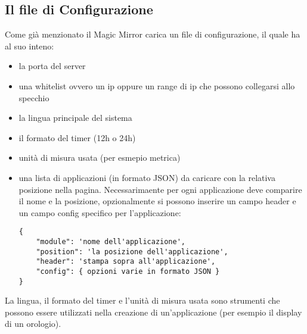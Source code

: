 \subsection{Il file di Configurazione}
Come già menzionato il Magic Mirror carica un file di configurazione, il quale ha al suo inteno:
\begin{itemize}
\item la porta del server
\item una whitelist ovvero un ip oppure un range di ip che possono collegarsi allo specchio
\item la lingua principale del sistema
\item il formato del timer (12h o 24h)
\item unità di misura usata (per esmepio metrica)
\item una lista di applicazioni (in formato JSON) da caricare con la relativa posizione nella pagina. Necessarimaente per ogni applicazione deve comparire il
nome e la posizione, opzionalmente si possono inserire un campo header e un campo config specifico per l'applicazione:
\begin{lstlisting}
{
	"module": 'nome dell'applicazione',
	"position": 'la posizione dell'applicazione',
	"header": 'stampa sopra all'applicazione',
	"config": { opzioni varie in formato JSON }
}
\end{lstlisting}
\end{itemize}
La lingua, il formato del timer e l'unità di misura usata sono strumenti che possono essere utilizzati nella creazione di un'applicazione
(per esempio il display di un orologio).

